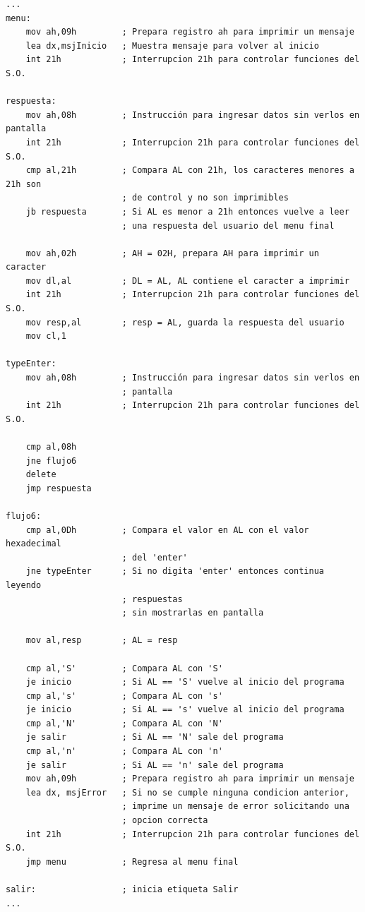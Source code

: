 \documentclass[letter,12 pt,titlepage]{article}
\begin{document}
    \begin{verbatim}
...
menu:
    mov ah,09h         ; Prepara registro ah para imprimir un mensaje
    lea dx,msjInicio   ; Muestra mensaje para volver al inicio
    int 21h            ; Interrupcion 21h para controlar funciones del S.O.

respuesta:
    mov ah,08h         ; Instrucción para ingresar datos sin verlos en pantalla
    int 21h            ; Interrupcion 21h para controlar funciones del S.O.
    cmp al,21h         ; Compara AL con 21h, los caracteres menores a 21h son  
                       ; de control y no son imprimibles
    jb respuesta       ; Si AL es menor a 21h entonces vuelve a leer 
                       ; una respuesta del usuario del menu final

    mov ah,02h         ; AH = 02H, prepara AH para imprimir un caracter
    mov dl,al          ; DL = AL, AL contiene el caracter a imprimir
    int 21h            ; Interrupcion 21h para controlar funciones del S.O.
    mov resp,al        ; resp = AL, guarda la respuesta del usuario
    mov cl,1

typeEnter:
    mov ah,08h         ; Instrucción para ingresar datos sin verlos en 
                       ; pantalla
    int 21h            ; Interrupcion 21h para controlar funciones del S.O.

    cmp al,08h
    jne flujo6
    delete
    jmp respuesta

flujo6:
    cmp al,0Dh         ; Compara el valor en AL con el valor hexadecimal 
                       ; del 'enter'
    jne typeEnter      ; Si no digita 'enter' entonces continua leyendo 
                       ; respuestas 
                       ; sin mostrarlas en pantalla

    mov al,resp        ; AL = resp

    cmp al,'S'         ; Compara AL con 'S'
    je inicio          ; Si AL == 'S' vuelve al inicio del programa
    cmp al,'s'         ; Compara AL con 's'
    je inicio          ; Si AL == 's' vuelve al inicio del programa
    cmp al,'N'         ; Compara AL con 'N'
    je salir           ; Si AL == 'N' sale del programa
    cmp al,'n'         ; Compara AL con 'n'
    je salir           ; Si AL == 'n' sale del programa
    mov ah,09h         ; Prepara registro ah para imprimir un mensaje
    lea dx, msjError   ; Si no se cumple ninguna condicion anterior,
                       ; imprime un mensaje de error solicitando una 
                       ; opcion correcta
    int 21h            ; Interrupcion 21h para controlar funciones del S.O.
    jmp menu           ; Regresa al menu final

salir:                 ; inicia etiqueta Salir
...
    \end{verbatim}
\end{document}
